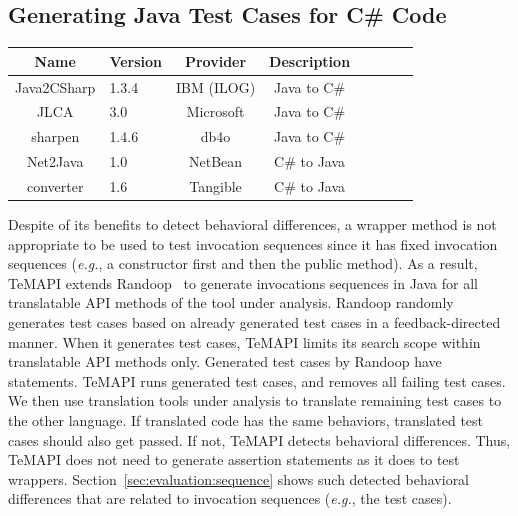 \subsection{Generating Java Test Cases for C\# Code}
\label{sec:approach:sequence}
\begin{table}[t]
\centering
\begin{SmallOut}
\begin {tabular} {|c|l|c|c|c|c|c|c|}
 \hline
\textbf{Name}& \textbf{Version}& \textbf{Provider} &\textbf{Description}\\
\hline
Java2CSharp  &  1.3.4 & IBM (ILOG) & Java to C\# \\
\hline
JLCA         &  3.0   & Microsoft  & Java to C\# \\
\hline
sharpen      &  1.4.6 & db4o       & Java to C\# \\
\hline
Net2Java     &  1.0   & NetBean    &  C\# to Java\\
\hline
converter    &  1.6   & Tangible   &  C\# to Java\\
\hline
\end{tabular}\vspace*{-2ex}
 \label{table:subjects}
\end{SmallOut}\vspace*{-4ex}
\end{table}
Despite of its benefits to detect behavioral differences, a wrapper method is not appropriate to be used to test invocation sequences since it has fixed invocation sequences (\emph{e.g.}, a constructor first and then the public method). As a result, TeMAPI extends Randoop~\cite{pacheco2007feedback} to generate invocations sequences in Java for all translatable API methods of the tool under analysis. Randoop randomly generates test cases based on already generated test cases in a feedback-directed manner. When it generates test cases, TeMAPI limits its search scope within translatable API methods only. Generated test cases by Randoop have  statements. TeMAPI runs generated test cases, and removes all failing test cases. We then use translation tools under analysis to translate remaining test cases to the other language. If translated code has the same behaviors, translated test cases should also get passed. If not, TeMAPI detects behavioral differences. Thus, TeMAPI does not need to generate assertion statements as it does to test wrappers. Section~\ref{sec:evaluation:sequence} shows such detected behavioral differences that are related to invocation sequences (\emph{e.g.}, the  test cases).




